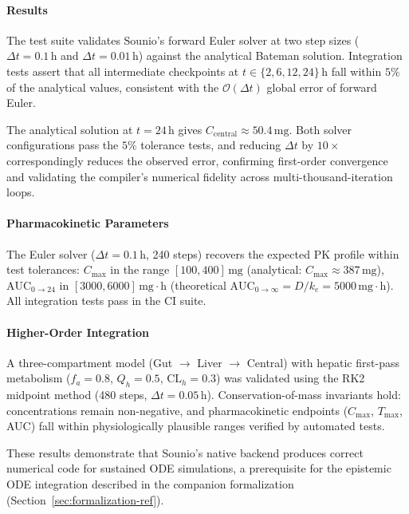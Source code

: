 \documentclass[11pt,a4paper]{article}
\begin{document}
\paragraph{Results}
The test suite validates Sounio's forward Euler solver at two step sizes
($\Delta t = 0.1\,\text{h}$ and $\Delta t = 0.01\,\text{h}$) against the
analytical Bateman solution. Integration tests assert that all intermediate
checkpoints at $t \in \{2, 6, 12, 24\}\,\text{h}$ fall within $5\%$ of
the analytical values, consistent with the $\mathcal{O}(\Delta t)$ global
error of forward Euler.

The analytical solution at $t = 24\,\text{h}$ gives
$C_{\text{central}} \approx 50.4\,\text{mg}$. Both solver configurations
pass the $5\%$ tolerance tests, and reducing $\Delta t$ by $10\times$
correspondingly reduces the observed error, confirming first-order
convergence and validating the compiler's numerical fidelity across
multi-thousand-iteration loops.

\paragraph{Pharmacokinetic Parameters}
The Euler solver ($\Delta t = 0.1\,\text{h}$, 240 steps) recovers the
expected PK profile within test tolerances:
$C_{\max}$ in the range $[100, 400]\,\text{mg}$
(analytical: $C_{\max} \approx 387\,\text{mg}$),
$\text{AUC}_{0 \to 24}$ in $[3000, 6000]\,\text{mg}\!\cdot\!\text{h}$
(theoretical $\text{AUC}_{0 \to \infty} = D/k_e = 5000\,\text{mg}\!\cdot\!\text{h}$).
All integration tests pass in the CI suite.

\paragraph{Higher-Order Integration}
A three-compartment model (Gut $\to$ Liver $\to$ Central) with hepatic
first-pass metabolism ($f_a = 0.8$, $Q_h = 0.5$, $\text{CL}_h = 0.3$)
was validated using the RK2 midpoint method (480 steps, $\Delta t = 0.05\,\text{h}$).
Conservation-of-mass invariants hold: concentrations remain non-negative,
and pharmacokinetic endpoints ($C_{\max}$, $T_{\max}$, AUC) fall within
physiologically plausible ranges verified by automated tests.

These results demonstrate that Sounio's native backend produces correct
numerical code for sustained ODE simulations, a prerequisite for the
epistemic ODE integration described in the companion formalization
(Section~\ref{sec:formalization-ref}).
\end{document}
